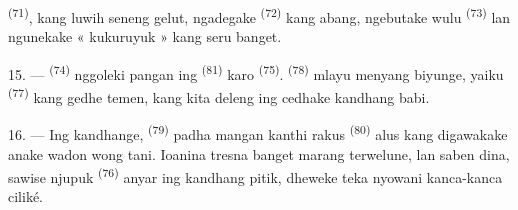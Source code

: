  \textsuperscript{(71)}, kang luwih seneng gelut, ngadegake
 \textsuperscript{(72)} kang abang, ngebutake wulu
 \textsuperscript{(73)} lan ngunekake « kukuruyuk » kang
seru banget.

15. ---  \textsuperscript{(74)} nggoleki pangan ing
 \textsuperscript{(81)} karo 
\textsuperscript{(75)}.  \textsuperscript{(78)} mlayu
menyang biyunge, yaiku  \textsuperscript{(77)} kang
gedhe temen, kang kita deleng ing cedhake kandhang babi.

16. --- Ing kandhange,  \textsuperscript{(79)} padha
mangan kanthi rakus  \textsuperscript{(80)} alus kang
digawakake anake wadon wong tani. Ioanina tresna banget marang
terwelune, lan saben dina, sawise njupuk 
\textsuperscript{(76)} anyar ing kandhang pitik, dheweke teka nyowani
kanca-kanca ciliké.

\VUsaut{6.0mm}
\VUfilet{22mm}
